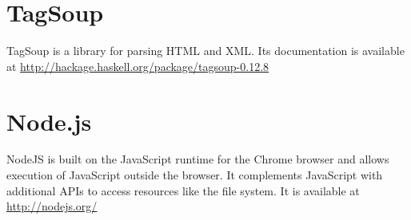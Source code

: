 \documentclass[thesis.tex]{subfiles}
\begin{document}
\section{TagSoup}
\label{sec:tagsoup}
TagSoup is a library for parsing HTML and XML. Its documentation is available at
\url{http://hackage.haskell.org/package/tagsoup-0.12.8}

\section{Node.js}
\label{sec:nodejs}
NodeJS is built on the JavaScript runtime for the Chrome browser and allows
execution of JavaScript outside the browser. It complements JavaScript with
additional APIs to access resources like the file system.
It is available at \url{http://nodejs.org/}
\end{document}
